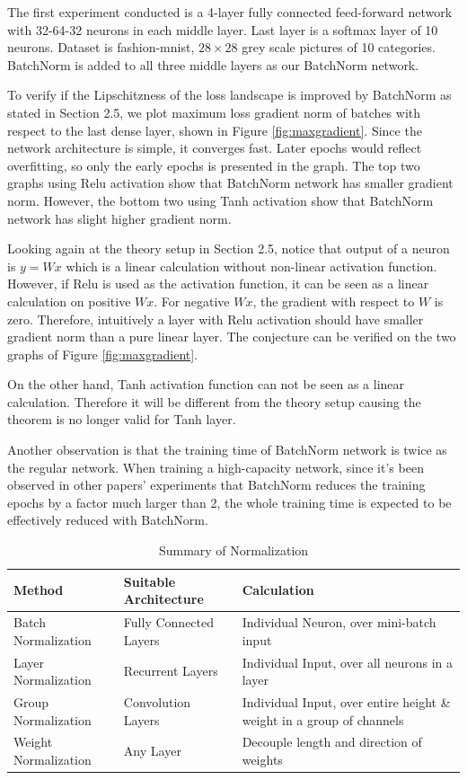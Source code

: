 \documentclass{article}
\begin{document}
The first experiment conducted is a 4-layer fully connected feed-forward network with 32-64-32 neurons in each middle layer. Last layer is a softmax layer of 10 neurons. Dataset is fashion-mnist, $28\times28$ grey scale pictures of 10 categories. BatchNorm is added to all three middle layers as our BatchNorm network.

To verify if the Lipschitzness of the loss landscape is improved by BatchNorm as stated in Section 2.5, we plot maximum loss gradient norm of batches with respect to the last dense layer, shown in Figure \ref{fig:maxgradient}. Since the network architecture is simple, it converges fast. Later epochs would reflect overfitting, so only the early epochs is presented in the graph. The top two graphs using Relu activation show that BatchNorm network has smaller gradient norm. However, the bottom two using Tanh activation show that BatchNorm network has slight higher gradient norm. 

Looking again at the theory setup in Section 2.5, notice that output of a neuron is $y=Wx$ which is a linear calculation without non-linear activation function. However, if Relu is used as the activation function, it can be seen as a linear calculation on positive $Wx$. For negative $Wx$, the gradient with respect to $W$ is zero. Therefore, intuitively a layer with Relu activation should have smaller gradient norm than a pure linear layer. The conjecture can be verified on the two graphs of Figure \ref{fig:maxgradient}. 

On the other hand, Tanh activation function can not be seen as a linear calculation. Therefore it will be different from the theory setup causing the theorem is no longer valid for Tanh layer.

Another observation is that the training time of BatchNorm network is twice as the regular network. When training a high-capacity network, since it's been observed in other papers' experiments that BatchNorm reduces the training epochs by a factor much larger than 2, the whole training time is expected to be effectively reduced with BatchNorm.

\begingroup
\setlength{\tabcolsep}{10pt} %
\renewcommand{\arraystretch}{1.5} %
\begin{table} [!ht]
\centering
 \begin{tabular}{|m{10em} | m{10em} | m{10em}|} 
 \hline
 Method & Suitable Architecture & Calculation\\  
 \hline
 Batch Normalization & Fully Connected Layers & Individual Neuron, over mini-batch input\\ [0.5ex] 
 \hline
 Layer Normalization & Recurrent Layers & Individual Input, over all neurons in a layer\\ [0.5ex]
 \hline
 Group Normalization & Convolution Layers & Individual Input, over entire height \& weight in a group of channels\\[0.5ex]
 \hline
 Weight Normalization & Any Layer & Decouple length and direction of weights\\
 \hline
\end{tabular}
\caption{Summary of Normalization}
\label{normsum}
\end{table}
\endgroup
\end{document}
